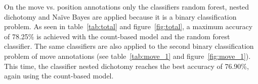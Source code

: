 \documentclass[article,type=msc,colorback,accentcolor=tud7b]{tudthesis}
\begin{document}
    \begin{figure}[H]
      \begin{floatrow}
      \end{floatrow}
    \end{figure}

On the move vs. position annotations only the classifiers random forest, nested dichotomy and Naïve Bayes are applied because it is a binary classification problem. As seen in table~\ref{tab:total} and figure~\ref{fig:total}, a maximum accuracy of 78.25\% is achieved with the count-based model and the random forest classifier. The same classifiers are also applied to the second binary classification problem of move annotations (see table~\ref{tab:move_1} and figure~\ref{fig:move_1}). This time, the classifier nested dichotomy reaches the best accuracy of 76.90\%, again using the count-based model.
\end{document}
